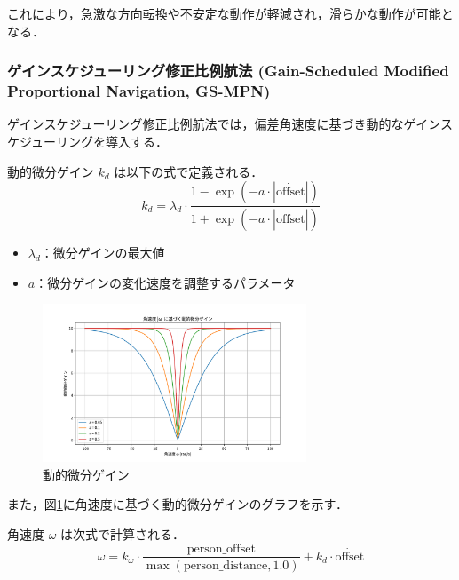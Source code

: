 これにより，急激な方向転換や不安定な動作が軽減され，滑らかな動作が可能となる．

\subsubsection{ゲインスケジューリング修正比例航法
    (Gain-Scheduled Modified Proportional Navigation, GS-MPN)}
ゲインスケジューリング修正比例航法では，偏差角速度に基づき動的なゲインスケジューリングを導入する．

動的微分ゲイン \(k_d\) は以下の式で定義される．
\begin{equation}
    k_d = \lambda_d \cdot \frac{1 - \exp(-a \cdot |\dot{\text{offset}}|)}{1 + \exp(-a \cdot |\dot{\text{offset}}|)}
\end{equation}
\begin{itemize}
    \item \(\lambda_d\)：微分ゲインの最大値
    \item \(a\)：微分ゲインの変化速度を調整するパラメータ
\end{itemize}

\begin{figure}[H]
    \centering
    \includegraphics[width=0.7\textwidth]{figure/dynamicgain.pdf}
    \caption{動的微分ゲイン}
    \label{fig:dynamicgain}
\end{figure}
また，図\ref{fig:dynamicgain}に角速度に基づく動的微分ゲインのグラフを示す．

角速度 \(\omega\) は次式で計算される．
\begin{equation}
    \omega = k_\omega \cdot \frac{\text{person\_offset}}{\max(\text{person\_distance}, 1.0)} + k_d \cdot \dot{\text{offset}}
\end{equation}

